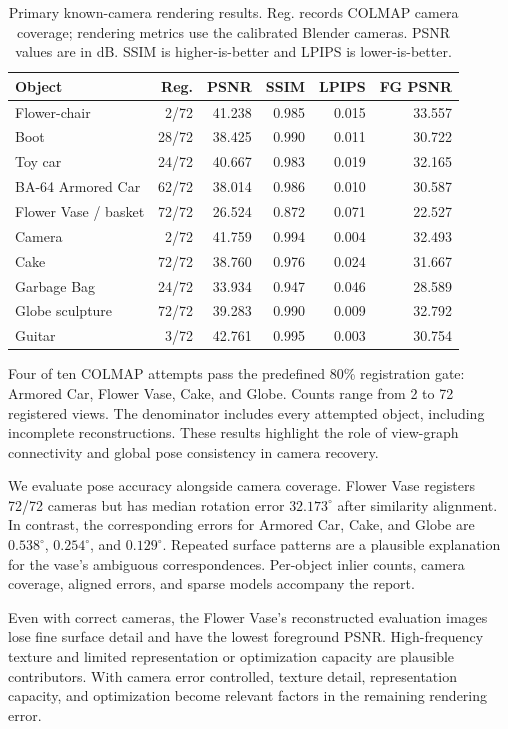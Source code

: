 \documentclass{article}
\begin{document}
\begin{table}[t]
\caption{Primary known-camera rendering results. Reg. records COLMAP camera coverage; rendering metrics use the calibrated Blender cameras. PSNR values are in dB. SSIM is higher-is-better and LPIPS is lower-is-better.}
\label{tab:results}\centering\small
\begin{tabular}{lrrrrr}
\toprule
Object & Reg. & PSNR & SSIM & LPIPS & FG PSNR\\
\midrule
Flower-chair & 2/72 & 41.238 & 0.985 & 0.015 & 33.557 \\
Boot & 28/72 & 38.425 & 0.990 & 0.011 & 30.722 \\
Toy car & 24/72 & 40.667 & 0.983 & 0.019 & 32.165 \\
BA-64 Armored Car & 62/72 & 38.014 & 0.986 & 0.010 & 30.587 \\
Flower Vase / basket & 72/72 & 26.524 & 0.872 & 0.071 & 22.527 \\
Camera & 2/72 & 41.759 & 0.994 & 0.004 & 32.493 \\
Cake & 72/72 & 38.760 & 0.976 & 0.024 & 31.667 \\
Garbage Bag & 24/72 & 33.934 & 0.947 & 0.046 & 28.589 \\
Globe sculpture & 72/72 & 39.283 & 0.990 & 0.009 & 32.792 \\
Guitar & 3/72 & 42.761 & 0.995 & 0.003 & 30.754 \\
\bottomrule
\end{tabular}
\end{table}

Four of ten COLMAP attempts pass the predefined 80\% registration gate: Armored Car, Flower Vase, Cake, and Globe. Counts range from 2 to 72 registered views. The denominator includes every attempted object, including incomplete reconstructions. These results highlight the role of view-graph connectivity and global pose consistency in camera recovery.

We evaluate pose accuracy alongside camera coverage. Flower Vase registers 72/72 cameras but has median rotation error $32.173^\circ$ after similarity alignment. In contrast, the corresponding errors for Armored Car, Cake, and Globe are $0.538^\circ$, $0.254^\circ$, and $0.129^\circ$. Repeated surface patterns are a plausible explanation for the vase's ambiguous correspondences. Per-object inlier counts, camera coverage, aligned errors, and sparse models accompany the report.

Even with correct cameras, the Flower Vase's reconstructed evaluation images lose fine surface detail and have the lowest foreground PSNR. High-frequency texture and limited representation or optimization capacity are plausible contributors. With camera error controlled, texture detail, representation capacity, and optimization become relevant factors in the remaining rendering error.
\end{document}
